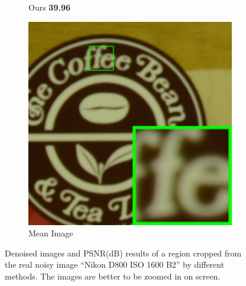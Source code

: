 \begin{figure}
\begin{subfigure}[t]{0.19\textwidth}
\caption{Ours \textbf{39.96}}
    \end{subfigure}
    \hfill
    \begin{subfigure}[t]{0.19\textwidth}
        \centering
        \includegraphics[width=1\textwidth]{images/guided/cc60/resize_br_Mean_CC_Noisy_Nikon_D800_ISO_1600_B2_109.png}
\caption{Mean Image}
    \end{subfigure}
    \caption{Denoised images and PSNR(dB) results of a region cropped from the real noisy image ``Nikon D800 ISO 1600 B2'' \cite{crosschannel2016} by different methods. The images are better to be zoomed in on screen.}
    \label{fig3-16}
\end{figure}


